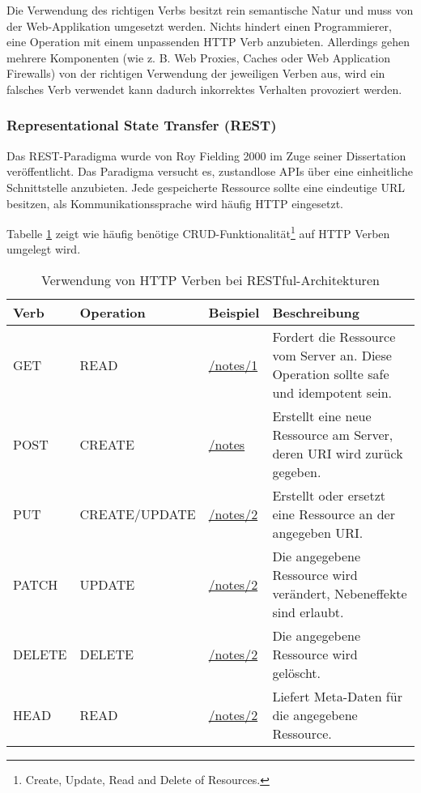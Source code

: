 Die Verwendung des richtigen Verbs besitzt rein semantische Natur und muss von der Web-Applikation umgesetzt werden. Nichts hindert einen Programmierer, eine Operation mit einem unpassenden HTTP Verb anzubieten. Allerdings gehen mehrere Komponenten (wie z. B. Web Proxies, Caches oder Web Application Firewalls) von der richtigen Verwendung der jeweiligen Verben aus, wird ein falsches Verb verwendet kann dadurch inkorrektes Verhalten provoziert werden.

\subsubsection{Representational State Transfer (REST)}

Das REST-Paradigma wurde von Roy Fielding 2000 im Zuge seiner Dissertation veröffentlicht. Das Paradigma versucht es, zustandlose APIs über eine einheitliche Schnittstelle anzubieten. Jede gespeicherte Ressource sollte eine eindeutige URL besitzen, als Kommunikationssprache wird häufig HTTP eingesetzt.

Tabelle \ref{tbl:rest} zeigt wie häufig benötige CRUD-Funktionalität\footnote{Create, Update, Read and Delete of Resources.} auf HTTP Verben umgelegt wird.

\begin{table}
	\begin{center}
\begin{tabular}{lllp{6cm}}
	\toprule
	Verb & Operation & Beispiel & Beschreibung \\
	\midrule
	GET  & READ & \url{/notes/1} & Fordert die Ressource vom Server an. Diese Operation sollte safe und idempotent sein. \\
	POST & CREATE & \url{/notes} &  Erstellt eine neue Ressource am Server, deren URI wird zurück gegeben.\\
	PUT  & CREATE/UPDATE & \url{/notes/2} & Erstellt oder ersetzt eine Ressource an der angegeben URI.\\
	PATCH & UPDATE & \url{/notes/2} & Die angegebene Ressource wird verändert, Nebeneffekte sind erlaubt. \\
	DELETE & DELETE & \url{/notes/2} & Die angegebene Ressource wird gelöscht. \\
	HEAD & READ & \url{/notes/2} & Liefert Meta-Daten für die angegebene Ressource. \\
	\bottomrule
\end{tabular}
	\caption{Verwendung von HTTP Verben bei RESTful-Architekturen}
	\label{tbl:rest}
\end{center}
\end{table}

